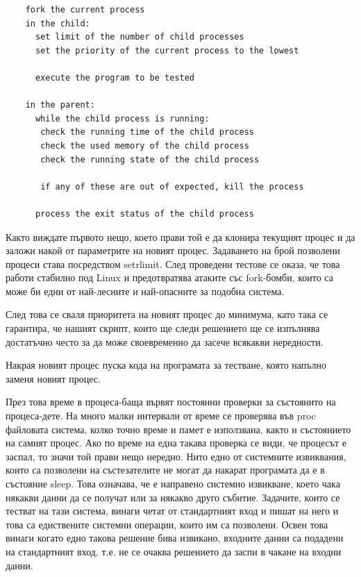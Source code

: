 \documentclass[a4paper,12pt]{article}
\begin{document}
  \begin{lstlisting}
    fork the current process
    in the child:
      set limit of the number of child processes
      set the priority of the current process to the lowest
      
      execute the program to be tested
    
    in the parent:
      while the child process is running:
       check the running time of the child process
       check the used memory of the child process
       check the running state of the child process
       
       if any of these are out of expected, kill the process
       
      process the exit status of the child process
  \end{lstlisting}
  
  Както виждате първото нещо, което прави той е да клонира текущият процес и да заложи накой от параметрите на новият процес. Задаването на брой позволени процеси става посредством setrlimit. След проведени тестове се оказа, че това работи стабилно под Linux и предотвратява атаките със fork-бомби, които са може би едни от най-лесните и най-опасните за подобна система.
  
  След това се сваля приоритета на новият процес до минимума, като така се гарантира, че нашият скрипт, които ще следи решението ще се изпълнява достатъчно често за да може своевременно да засече всякакви нередности.
  
  Накрая новият процес пуска кода на програмата за тестване, която напълно заменя новият процес.
  
  През това време в процеса-баща вървят постоянни проверки за състоянито на процеса-дете. На много малки интервали от време се проверява във proc файловата система, колко точно време и памет е използвана, както и състоянието на самият процес. Ако по време на една такава проверка се види, че процесът е заспал, то значи той прави нещо нередно. Нито едно от системните извиквания, които са позволени на състезателите не могат да накарат програмата да е в състояние sleep. Това означава, че е направено системно извикване, което чака някакви данни да се получат или за някакво друго събитие. Задачите, които се тестват на тази система, винаги четат от стандартният вход и пишат на него и това са едиствените системни операции, които им са позволени. Освен това винаги когато едно такова решение бива извикано, входните данни са подадени на стандартният вход, т.е. не се очаква решението да заспи в чакане на входни данни.
  
\end{document}
